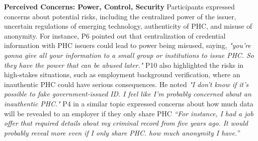 \textbf{Perceived Concerns: Power, Control, Security} 
Participants expressed concerns about potential risks, including the centralized power of the issuer, uncertain regulations of emerging technology, authenticity of PHC, and misuse of anonymity.
For instance, P6 pointed out that centralization of credential information with PHC issuers could lead to power being misused, saying, \textit{"you're gonna give all your information to a small group or institutions to issue PHC. So they have the power that can be abused later."} 
P10 also highlighted the risks in high-stakes situations, such as employment background verification, where an inauthentic PHC could have serious consequences. He noted \textit{"I don't know if it's possible to fake government-issued ID. I feel like I'm probably concerned about an inauthentic PHC."} P4 in a similar topic expressed concerns about how much data will be revealed to an employer if they only share PHC \textit{``For instance, I had a job offer that required details about my criminal record from five years ago. It would probably reveal more even if I only share PHC. how much anonymity I have.''}


